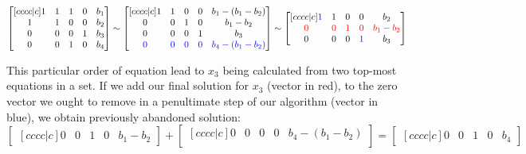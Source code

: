 \begin{equation}
\begin{bmatrix}[cccc|c]
    1 & 1 & 1 & 0 & b_1 \\ 
    1 & 1 & 0 & 0 & b_2 \\ 
    0 & 0 & 0 & 1 & b_3 \\ 
    0 & 0 & 1 & 0 & b_4
\end{bmatrix}
\sim
\begin{bmatrix}[cccc|c]
    1 & 1 & 0 & 0 & b_1 - (b_1 - b_2) \\ 
    0 & 0 & 1 & 0 & b_1 - b_2 \\ 
    0 & 0 & 0 & 1 & b_3 \\ 
    \textcolor{blue}{0} & \textcolor{blue}{0} & \textcolor{blue}{0} & \textcolor{blue}{0} &\textcolor{blue}{b_4 - (b_1 - b_2)}
\end{bmatrix}
\sim
\begin{bmatrix}[cccc|c]
    \textcolor{blue}{1} & 1 & 0 & 0 & b_2 \\ 
    \textcolor{red}{0} & \textcolor{red}{0} & \textcolor{red}{1} & \textcolor{red}{0} & \textcolor{red}{b_1 - b_2} \\ 
    0 & 0 & 0 & \textcolor{blue}{1} & b_3 \\ 
\end{bmatrix}
\end{equation}

This particular order of equation lead to $x_3$ being calculated from two top-most equations in a set.
If we add our final solution for $x_3$ (vector in red), to the zero vector we ought to remove in a penultimate step of our algorithm (vector in blue), we obtain previously abandoned solution:
\begin{equation}
\begin{bmatrix}[cccc|c]
    0 & 0 & 1 & 0 & b_1-b_2
\end{bmatrix}
+
\begin{bmatrix}[cccc|c]
    0 & 0 & 0 & 0 & b_4 - (b_1 - b_2) \\ 
\end{bmatrix}
=
\begin{bmatrix}[cccc|c]
    0 & 0 & 1 & 0 & b_4
\end{bmatrix}
\end{equation}

